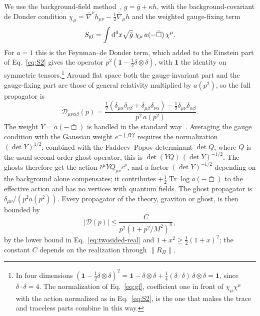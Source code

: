 \documentclass[a4paper,11pt]{article}
\newcommand{\dd}{\mathrm{d}}
\newcommand{\Tr}{\operatorname{Tr}}
\begin{document}
We use the background-field method~\cite{Abbott1981}, $g=\bar g+\kappa h$, with the background-covariant de Donder condition $\chi_\mu=\bar\nabla^\nu h_{\mu\nu}-\frac12\bar\nabla_\mu h$ and the weighted gauge-fixing term
\begin{equation}
\label{eq:gf}
S_{\rm gf}=\int\dd^4x\sqrt{\bar g}\;\chi_\mu\,a(-\bar\Box)\,\chi^\mu .
\end{equation}
For $a=1$ this is the Feynman--de Donder term, which added to the Einstein part of Eq.~\eqref{eq:S2} gives the operator $p^2(\mathbf 1-\frac12\delta\otimes\delta)$, with $\mathbf 1$ the identity on symmetric tensors.\footnote{In four dimensions $(\mathbf 1-\frac12\delta\otimes\delta)^2=\mathbf 1-\delta\otimes\delta+\frac14(\delta\cdot\delta)\,\delta\otimes\delta=\mathbf 1$, since $\delta\cdot\delta=4$. The normalization of Eq.~\eqref{eq:gf}, coefficient one in front of $\chi_\mu\chi^\mu$ with the action normalized as in Eq.~\eqref{eq:S2}, is the one that makes the trace and traceless parts combine in this way.} Around flat space both the gauge-invariant part and the gauge-fixing part are those of general relativity multiplied by $a(p^2)$, so the full propagator is
\begin{equation}
\label{eq:propfull}
\mathcal D_{\mu\nu\alpha\beta}(p)=\frac{\frac12(\delta_{\mu\alpha}\delta_{\nu\beta}+\delta_{\mu\beta}\delta_{\nu\alpha})-\frac12\delta_{\mu\nu}\delta_{\alpha\beta}}{p^2\,a(p^2)}.
\end{equation}
The weight $Y=a(-\bar\Box)$ is handled in the standard way~\cite{Nielsen1978,Kallosh1978}. Averaging the gauge condition with the Gaussian weight $e^{-\int fYf}$ requires the normalization $(\det Y)^{1/2}$; combined with the Faddeev--Popov determinant $\det Q$, where $Q$ is the usual second-order ghost operator, this is $\det(YQ)\,(\det Y)^{-1/2}$. The ghosts therefore get the action $\bar c^\mu YQ_{\mu\nu}c^\nu$, and a factor $(\det Y)^{-1/2}$ depending on the background alone compensates; it contributes $+\frac12\Tr\log a(-\bar\Box)$ to the effective action and has no vertices with quantum fields. The ghost propagator is $\delta_{\mu\nu}/(p^2a(p^2))$. Every propagator of the theory, graviton or ghost, is then bounded by
\begin{equation}
\label{eq:propbound}
|\mathcal D(p)|\le\frac{C}{p^2(1+p^2/M^2)^{n}},
\end{equation}
by the lower bound in Eq.~\eqref{eq:twosided-real} and $1+x^2\ge\frac12(1+x)^2$; the constant $C$ depends on the realization through $\|R_\Pi\|$.
\end{document}
